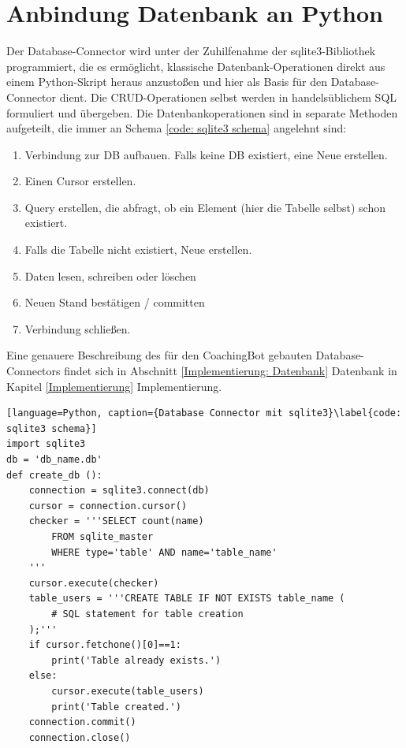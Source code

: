     \section{Anbindung Datenbank an Python} \label{Realisierung: data base connector}
        Der Database-Connector wird unter der Zuhilfenahme der sqlite3-Bibliothek programmiert, die es ermöglicht, klassische Datenbank-Operationen direkt aus einem Python-Skript heraus anzustoßen und hier als Basis für den Database-Connector dient. Die CRUD-Operationen selbst werden in handelsüblichem SQL formuliert und übergeben. Die Datenbankoperationen sind in separate Methoden aufgeteilt, die immer an Schema \ref*{code: sqlite3 schema} angelehnt sind: 
        \begin{enumerate}
            \item Verbindung zur DB aufbauen. Falls keine DB existiert, eine Neue erstellen.
            \item Einen Cursor erstellen.
            \item Query erstellen, die abfragt, ob ein Element (hier die Tabelle selbst) schon existiert.
            \item Falls die Tabelle nicht existiert, Neue erstellen.
            \item Daten lesen, schreiben oder löschen
            \item Neuen Stand bestätigen / committen
            \item Verbindung schließen.
        \end{enumerate}

        Eine genauere Beschreibung des für den CoachingBot gebauten Database-Connectors findet sich in Abschnitt \ref*{Implementierung: Datenbank} Datenbank in Kapitel \ref*{Implementierung} Implementierung.

        \begin{lstlisting}[language=Python, caption={Database Connector mit sqlite3}\label{code: sqlite3 schema}]
import sqlite3
db = 'db_name.db'
def create_db ():
    connection = sqlite3.connect(db)
    cursor = connection.cursor()
    checker = '''SELECT count(name)
        FROM sqlite_master
        WHERE type='table' AND name='table_name'
    '''
    cursor.execute(checker)
    table_users = '''CREATE TABLE IF NOT EXISTS table_name (
        # SQL statement for table creation
    );'''
    if cursor.fetchone()[0]==1:
        print('Table already exists.')
    else:
        cursor.execute(table_users)
        print('Table created.')
    connection.commit()
    connection.close()
        \end{lstlisting}


